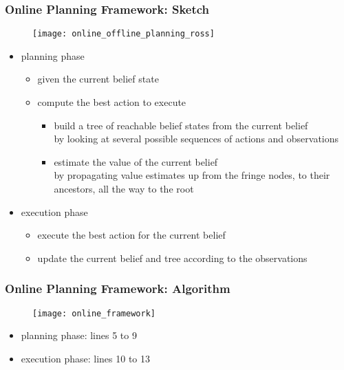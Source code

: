 \begin{frame}
\frametitle{Online Planning Framework: Sketch}
\begin{figure}
    \centering
    \texttt{[image: online\_offline\_planning\_ross]}
\end{figure}

\begin{itemize}
    \item planning phase \pause
        \begin{itemize}
        \item given the current belief state \pause
        \item compute the best action to execute \pause
            \begin{itemize}
            \item build a tree of reachable belief states from the current belief \\
                by looking at several possible sequences of actions and observations
                \pause
            \item estimate the value of the current belief \\
                by propagating value estimates up from the fringe nodes, to their ancestors, all the way to the root
                \pause
            \end{itemize}
        \end{itemize}
    \item execution phase \pause
        \begin{itemize}
        \item execute the best action for the current belief \pause
        \item update the current belief and tree according to the observations
        \end{itemize}
\end{itemize}
\end{frame}

\begin{frame}
\frametitle{Online Planning Framework: Algorithm}
\begin{figure}
    \centering
    \texttt{[image: online\_framework]}
\end{figure}

\begin{itemize}
\item planning phase: lines 5 to 9
\item execution phase: lines 10 to 13
\end{itemize}
\end{frame}